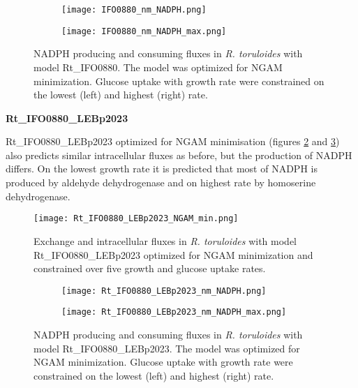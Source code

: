 \begin{figure}[h!]
    \centering
    \begin{subfigure}[h!]{0.49\textwidth}
        \centering
        \texttt{[image: IFO0880\_nm\_NADPH.png]}
    \end{subfigure}
    \hfill
    \begin{subfigure}[h!]{0.49\textwidth}
        \centering
        \texttt{[image: IFO0880\_nm\_NADPH\_max.png]}
    \end{subfigure}
    \caption{NADPH producing and consuming fluxes in \textit{R. toruloides} with model Rt\_IFO0880. The model was optimized for NGAM minimization. 
    Glucose uptake with growth rate were constrained on the lowest (left) and highest (right) rate.}
    \label{fig:IFO0880_nm_NADPH}
\end{figure}



\textbf{Rt\_IFO0880\_LEBp2023}

Rt\_IFO0880\_LEBp2023 optimized for NGAM minimisation (figures \ref{fig:Rt_IFO0880_LEBp2023_NGAM_min} and \ref{fig:Rt_IFO0880_LEBp2023_nm_NADPH}) also predicts 
similar intracellular fluxes as before, but the production of NADPH differs. On the lowest growth rate it is predicted that most of NADPH is produced by 
aldehyde dehydrogenase and on highest rate by homoserine dehydrogenase. 

\begin{figure}[h!]
    \centering
    \texttt{[image: Rt\_IFO0880\_LEBp2023\_NGAM\_min.png]}
    \caption{Exchange and intracellular fluxes in \textit{R. toruloides} with model Rt\_IFO0880\_LEBp2023 optimized for NGAM minimization 
    and constrained over five growth and glucose uptake rates.}
    \label{fig:Rt_IFO0880_LEBp2023_NGAM_min}
\end{figure}

\begin{figure}[h!]
    \centering
    \begin{subfigure}[h!]{0.49\textwidth}
        \centering
        \texttt{[image: Rt\_IFO0880\_LEBp2023\_nm\_NADPH.png]}
    \end{subfigure}
    \hfill
    \begin{subfigure}[h!]{0.49\textwidth}
        \centering
        \texttt{[image: Rt\_IFO0880\_LEBp2023\_nm\_NADPH\_max.png]}
    \end{subfigure}
    \caption{NADPH producing and consuming fluxes in \textit{R. toruloides} with model Rt\_IFO0880\_LEBp2023. The model was optimized for NGAM minimization. 
    Glucose uptake with growth rate were constrained on the lowest (left) and highest (right) rate.}
    \label{fig:Rt_IFO0880_LEBp2023_nm_NADPH}
\end{figure}







